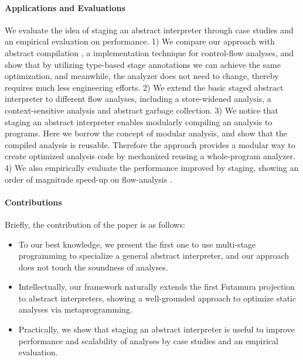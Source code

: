 \paragraph{Applications and Evaluations}
We evaluate the idea of staging an abstract interpreter through
case studies and an empirical evaluation on performance.
1) We compare our approach with abstract compilation
\cite{Boucher:1996:ACN:647473.727587}, a implementation technique for
control-flow analyses, and show that by utilizing type-based stage
annotations we can achieve the same optimization, and meanwhile,
the analyzer does not need to change, thereby requires much less
engineering efforts.
2) We extend the basic staged abstract interpreter to different flow
analyses, including a store-widened analysis, a context-sensitive
analysis and abstract garbage collection.
3) We notice that staging an abstract interpreter enables modularly
compiling an analysis to programs. Here we borrow the concept of modular
analysis, and show that the compiled analysis is reusable.
Therefore the approach provides a modular way to create optimized analysis
code by mechanized reusing a whole-program analyzer.
4) We also empirically evaluate the performance improved by staging,
showing an order of magnitude speed-up on flow-analysis .

\paragraph{Contributions} Briefly, the contribution of the paper is as follows:
\begin{itemize}[leftmargin=2em]
  \item To our best knowledge, we present the first one to use
    multi-stage programming to specialize a general abstract interpreter,
    and our approach does not touch the soundness of analyses.
  \item Intellectually, our framework naturally extends the first
    Futamura projection to abstract interpreters, showing a
    well-grounded approach to optimize static analyses via
    metaprogramming.
  \item Practically, we show that staging an abstract interpreter is
    useful to improve performance and scalability of analyses by case
    studies and an empirical evaluation.
\end{itemize}

